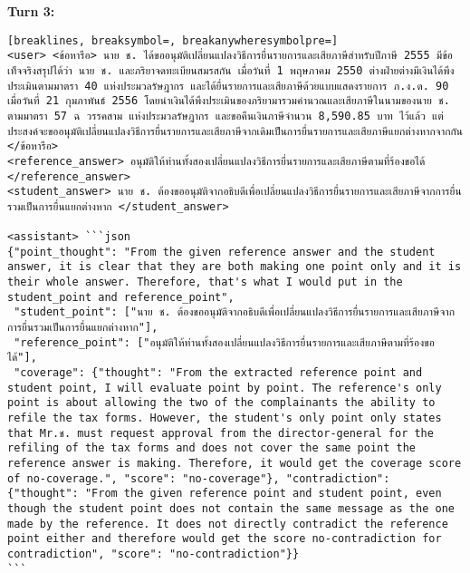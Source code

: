 \textbf{Turn 3: }
\begin{Verbatim}[breaklines, breaksymbol=, breakanywheresymbolpre=]
<user> <ข้อหารือ> นาย ช. ได้ขออนุมัติเปลี่ยนแปลงวิธีการยื่นรายการและเสียภาษีสำหรับปีภาษี 2555 มีข้อเท็จจริงสรุปได้ว่า นาย ช. และภริยาจดทะเบียนสมรสกัน เมื่อวันที่ 1 พฤษภาคม 2550 ต่างฝ่ายต่างมีเงินได้พึงประเมินตามมาตรา 40 แห่งประมวลรัษฎากร และได้ยื่นรายการและเสียภาษีด้วยแบบแสดงรายการ ภ.ง.ด. 90 เมื่อวันที่ 21 กุมภาพันธ์ 2556 โดยนำเงินได้พึงประเมินของภริยามารวมคำนวณและเสียภาษีในนามของนาย ช. ตามมาตรา 57 ฉ วรรคสาม แห่งประมวลรัษฎากร และขอคืนเงินภาษีจำนวน 8,590.85 บาท ไว้แล้ว แต่ประสงค์จะขออนุมัติเปลี่ยนแปลงวิธีการยื่นรายการและเสียภาษีจากเดิมเป็นการยื่นรายการและเสียภาษีแยกต่างหากจากกัน </ข้อหารือ>
<reference_answer> อนุมัติให้ท่านทั้งสองเปลี่ยนแปลงวิธีการยื่นรายการและเสียภาษีตามที่ร้องขอได้ </reference_answer>
<student_answer> นาย ช. ต้องขออนุมัติจากอธิบดีเพื่อเปลี่ยนแปลงวิธีการยื่นรายการและเสียภาษีจากการยื่นรวมเป็นการยื่นแยกต่างหาก </student_answer>

<assistant> ```json
{"point_thought": "From the given reference answer and the student answer, it is clear that they are both making one point only and it is their whole answer. Therefore, that's what I would put in the student_point and reference_point",
 "student_point": ["นาย ช. ต้องขออนุมัติจากอธิบดีเพื่อเปลี่ยนแปลงวิธีการยื่นรายการและเสียภาษีจากการยื่นรวมเป็นการยื่นแยกต่างหาก"],
 "reference_point": ["อนุมัติให้ท่านทั้งสองเปลี่ยนแปลงวิธีการยื่นรายการและเสียภาษีตามที่ร้องขอได้"],
 "coverage": {"thought": "From the extracted reference point and student point, I will evaluate point by point. The reference's only point is about allowing the two of the complainants the ability to refile the tax forms. However, the student's only point only states that Mr.ช. must request approval from the director-general for the refiling of the tax forms and does not cover the same point the reference answer is making. Therefore, it would get the coverage score of no-coverage.", "score": "no-coverage"}, "contradiction": {"thought": "From the given reference point and student point, even though the student point does not contain the same message as the one made by the reference. It does not directly contradict the reference point either and therefore would get the score no-contradiction for contradiction", "score": "no-contradiction"}}
```

\end{Verbatim}

